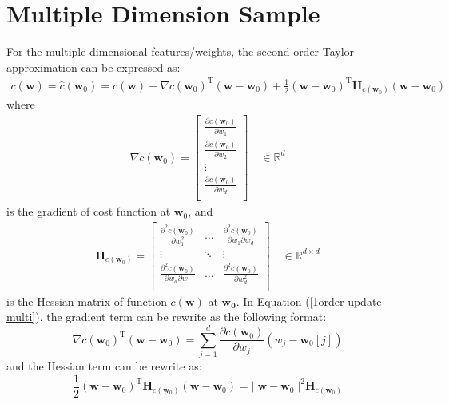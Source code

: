 \documentclass{article}
\begin{document}
\section{Multiple Dimension Sample}
For the multiple dimensional features/weights, the second order Taylor approximation can be expressed as:
\begin{equation}\label{1order update multi}
    \begin{aligned}
        c(\mathbf{w}) = \hat{c}(\mathbf{w}_0) = c(\mathbf{w}) + \nabla c(\mathbf{w}_0)^{\mathrm{T}}(\mathbf{w}-\mathbf{w}_0) + \frac{1}{2}(\mathbf{w}-\mathbf{w}_0)^{\mathrm{T}}\mathbf{H}_{c(\mathbf{w}_0)}(\mathbf{w}-\mathbf{w}_0)
    \end{aligned}
\end{equation}
where 
\begin{equation}
    \begin{aligned}
        \nabla c(\mathbf{w}_0) = 
        \begin{bmatrix}
            \frac{\partial c(\mathbf{w}_0)}{\partial w_1} \\
            \frac{\partial c(\mathbf{w}_0)}{\partial w_2} \\
            \vdots\\
            \frac{\partial c(\mathbf{w}_0)}{\partial w_d} \\
        \end{bmatrix}
        \quad \in \mathbb{R}^d
    \end{aligned}
\end{equation}
is the gradient of cost function at $\mathbf{w}_0$, and
\begin{equation}
    \begin{aligned}
        \mathbf{H}_{c(\mathbf{w}_0)} = 
        \begin{bmatrix}
            \frac{\partial^2 c(\mathbf{w}_0)}{\partial w_1^2}   &   \ldots  &   \frac{\partial^2 c(\mathbf{w}_0)}{\partial w_1 \partial w_d}\\
            \vdots  &   \ddots  &   \vdots\\
            \frac{\partial^2 c(\mathbf{w}_0)}{\partial w_d \partial w_1}   &   \ldots  &   \frac{\partial^2 c(\mathbf{w}_0)}{\partial w_d^2}\\
        \end{bmatrix}
        \quad \in \mathbb{R}^{d\times d}
    \end{aligned}
\end{equation}
is the Hessian matrix of function $c(\mathbf{w})$ at $\mathbf{w_0}$. In Equation (\ref{1order update multi}), the gradient term can be rewrite as the following format:
$$\nabla c(\mathbf{w}_0)^{\mathrm{T}}(\mathbf{w}-\mathbf{w}_0) = \sum_{j=1}^{d}\frac{\partial c(\mathbf{w}_0)}{\partial w_j}(w_j-\mathbf{w}_0 [j])$$
and the Hessian term can be rewrite as:
$$\frac{1}{2}(\mathbf{w}-\mathbf{w}_0)^{\mathrm{T}}\mathbf{H}_{c(\mathbf{w}_0)}(\mathbf{w}-\mathbf{w}_0) = ||\mathbf{w}-\mathbf{w}_0||^2\mathbf{H}_{c(\mathbf{w}_0)}$$
\end{document}
